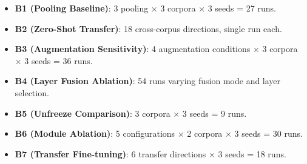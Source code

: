 \begin{itemize}
    \item \textbf{B1 (Pooling Baseline)}: 3 pooling $\times$ 3 corpora $\times$ 3 seeds = 27 runs.
    \item \textbf{B2 (Zero-Shot Transfer)}: 18 cross-corpus directions, single run each.
    \item \textbf{B3 (Augmentation Sensitivity)}: 4 augmentation conditions $\times$ 3 corpora $\times$ 3 seeds = 36 runs.
    \item \textbf{B4 (Layer Fusion Ablation)}: 54 runs varying fusion mode and layer selection.
    \item \textbf{B5 (Unfreeze Comparison)}: 3 corpora $\times$ 3 seeds = 9 runs.
    \item \textbf{B6 (Module Ablation)}: 5 configurations $\times$ 2 corpora $\times$ 3 seeds = 30 runs.
    \item \textbf{B7 (Transfer Fine-tuning)}: 6 transfer directions $\times$ 3 seeds = 18 runs.
\end{itemize}
